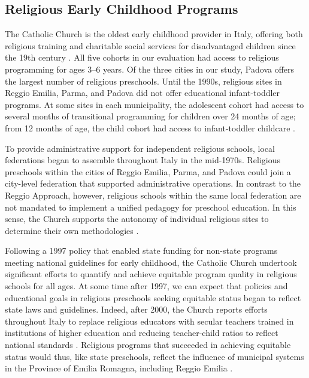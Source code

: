 \subsection{Religious Early Childhood Programs}

The Catholic Church is the oldest early childhood provider in Italy, offering both religious training and charitable social services for disadvantaged children since the 19th century \citep{OECD_2001_Italy-Country-Note}. All five cohorts in our evaluation had access to religious programming for ages 3--6 years. Of the three cities in our study, Padova offers the largest number of religious preschools. Until the 1990s, religious sites in Reggio Emilia, Parma, and Padova did not offer educational infant-toddler programs. At some sites in each municipality, the adolescent cohort had access to several months of transitional programming for children over 24 months of age; from 12 months of age, the child cohort had access to infant-toddler childcare \citep{Malizia-Cicatelli_2011_BOOK_Catholic-School,CEHD_2016_Historical-Analysis}.

To provide administrative support for independent religious schools, local federations began to assemble throughout Italy in the mid-1970s. Religious preschools within the cities of Reggio Emilia, Parma, and Padova could join a city-level federation that supported administrative operations. In contrast to the Reggio Approach, however, religious schools within the same local federation are not mandated to implement a unified pedagogy for preschool education. In this sense, the Church supports the autonomy of individual religious sites to determine their own methodologies \citep{Malizia-Cicatelli_2011_BOOK_Catholic-School}. 

Following a 1997 policy that enabled state funding for non-state programs meeting national guidelines for early childhood, the Catholic Church undertook significant efforts to quantify and achieve equitable program quality in religious schools for all ages. At some time after 1997, we can expect that policies and educational goals in religious preschools seeking equitable status began to reflect state laws and guidelines. Indeed, after 2000, the Church reports efforts throughout Italy to replace religious educators with secular teachers trained in institutions of higher education and reducing teacher-child ratios to reflect national standards \citep{Malizia-Cicatelli_2011_BOOK_Catholic-School}. Religious programs that succeeded in achieving equitable status would thus, like state preschools, reflect the influence of municipal systems in the Province of Emilia Romagna, including Reggio Emilia \citep{Hohnerlein_2009_Paradox-Public-Preschools,OECD_2001_Italy-Country-Note}. 

